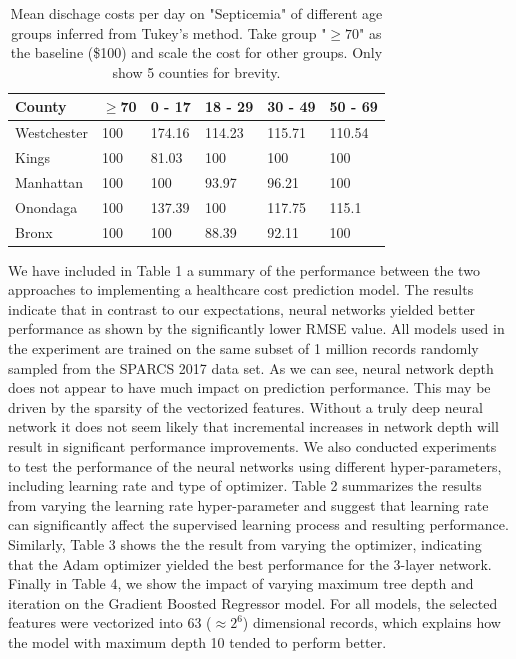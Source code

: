 \documentclass[10pt,twocolumn,letterpaper]{article}
\begin{document}
\begin{table}[t!]
\small
\begin{center}
\begin{tabular}{|l|l|l|l|l|l|}
\hline
\textbf{County} & \textbf{$\ge$70} & \textbf{0 - 17} & \textbf{18 - 29} & \textbf{30 - 49} & \textbf{50 - 69} \\ \hline
Westchester     & 100                  & 174.16           & 114.23            & 115.71            & 110.54            \\ \hline
Kings           & 100                  & 81.03            & 100               & 100               & 100               \\ \hline
Manhattan       & 100                  & 100              & 93.97             & 96.21             & 100               \\ \hline
Onondaga        & 100                  & 137.39           & 100               & 117.75            & 115.1             \\ \hline
Bronx           & 100                  & 100              & 88.39             & 92.11             & 100               \\ \hline
\end{tabular}
\end{center}
\caption{Mean dischage costs per day on "Septicemia" of different age groups inferred from Tukey's method. Take group "$\ge 70$" as the baseline (\$100) and scale the cost for other groups. Only show 5 counties for brevity.}
\end{table}




We have included in Table 1 a summary of the performance between the two approaches to implementing a healthcare cost prediction model. The results indicate that in contrast to our expectations, neural networks yielded better performance as shown by the significantly lower RMSE value. All models used in the experiment are trained on the same subset of 1 million records randomly sampled from the SPARCS 2017 data set. As we can see, neural network depth does not appear to have much impact on prediction performance. This may be driven by the sparsity of the vectorized features. Without a truly deep neural network it does not seem likely that incremental increases in network depth will result in significant performance improvements. We also conducted experiments to test the performance of the neural networks using different hyper-parameters, including learning rate and type of optimizer. Table 2 summarizes the results from varying the learning rate hyper-parameter and suggest that learning rate can significantly affect the supervised learning process and resulting performance. Similarly, Table 3 shows the the result from varying the optimizer, indicating that the Adam optimizer yielded the best performance for the 3-layer network. Finally in Table 4, we show the impact of varying maximum tree depth and iteration on the Gradient Boosted Regressor model. For all models, the selected features were vectorized into 63 ($\approx 2^6$) dimensional records, which explains how the model with maximum depth 10 tended to perform better.
\end{document}

